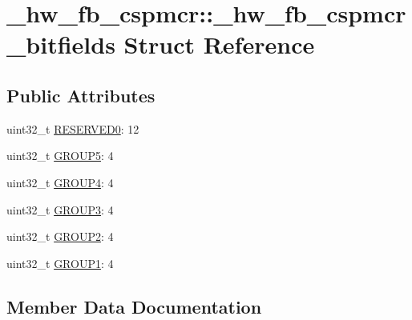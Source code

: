 \hypertarget{struct__hw__fb__cspmcr_1_1__hw__fb__cspmcr__bitfields}{}\section{\+\_\+hw\+\_\+fb\+\_\+cspmcr\+:\+:\+\_\+hw\+\_\+fb\+\_\+cspmcr\+\_\+bitfields Struct Reference}
\label{struct__hw__fb__cspmcr_1_1__hw__fb__cspmcr__bitfields}
\subsection*{Public Attributes}
\begin{DoxyCompactItemize}
\item 
uint32\+\_\+t \hyperlink{struct__hw__fb__cspmcr_1_1__hw__fb__cspmcr__bitfields_a95edd8c46ea26edb559d36c275234a6f}{R\+E\+S\+E\+R\+V\+E\+D0}\+: 12
\item 
uint32\+\_\+t \hyperlink{struct__hw__fb__cspmcr_1_1__hw__fb__cspmcr__bitfields_aeaa107d697fecc282cca3cb4fe42bf44}{G\+R\+O\+U\+P5}\+: 4
\item 
uint32\+\_\+t \hyperlink{struct__hw__fb__cspmcr_1_1__hw__fb__cspmcr__bitfields_a841d2799204083834bdfa62aecead8d4}{G\+R\+O\+U\+P4}\+: 4
\item 
uint32\+\_\+t \hyperlink{struct__hw__fb__cspmcr_1_1__hw__fb__cspmcr__bitfields_a2942b8085458c79721f073f60d871d34}{G\+R\+O\+U\+P3}\+: 4
\item 
uint32\+\_\+t \hyperlink{struct__hw__fb__cspmcr_1_1__hw__fb__cspmcr__bitfields_a8eafb95655dc0057258b240a2b92c935}{G\+R\+O\+U\+P2}\+: 4
\item 
uint32\+\_\+t \hyperlink{struct__hw__fb__cspmcr_1_1__hw__fb__cspmcr__bitfields_afb488e3d09042b02f282613a99d33274}{G\+R\+O\+U\+P1}\+: 4
\end{DoxyCompactItemize}


\subsection{Member Data Documentation}
